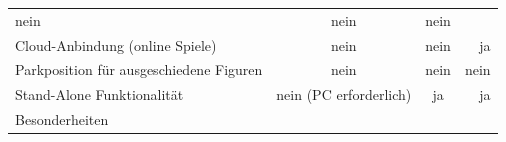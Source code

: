\begin{longtable}[]{@{}lccr@{}}
\begin{minipage}[t]{0.25\columnwidth}
nein\strut
\end{minipage} & \begin{minipage}[t]{0.26\columnwidth}\centering
nein\strut
\end{minipage} & \begin{minipage}[t]{0.19\columnwidth}\raggedleft
nein\strut
\end{minipage}\tabularnewline
\begin{minipage}[t]{0.19\columnwidth}\raggedright
Cloud-Anbindung (online Spiele)\strut
\end{minipage} & \begin{minipage}[t]{0.25\columnwidth}\centering
nein\strut
\end{minipage} & \begin{minipage}[t]{0.26\columnwidth}\centering
nein\strut
\end{minipage} & \begin{minipage}[t]{0.19\columnwidth}\raggedleft
ja\strut
\end{minipage}\tabularnewline
\begin{minipage}[t]{0.19\columnwidth}\raggedright
Parkposition für ausgeschiedene Figuren\strut
\end{minipage} & \begin{minipage}[t]{0.25\columnwidth}\centering
nein\strut
\end{minipage} & \begin{minipage}[t]{0.26\columnwidth}\centering
nein\strut
\end{minipage} & \begin{minipage}[t]{0.19\columnwidth}\raggedleft
nein\strut
\end{minipage}\tabularnewline
\begin{minipage}[t]{0.19\columnwidth}\raggedright
Stand-Alone Funktionalität\strut
\end{minipage} & \begin{minipage}[t]{0.25\columnwidth}\centering
nein (PC erforderlich)\strut
\end{minipage} & \begin{minipage}[t]{0.26\columnwidth}\centering
ja\strut
\end{minipage} & \begin{minipage}[t]{0.19\columnwidth}\raggedleft
ja\strut
\end{minipage}\tabularnewline
\begin{minipage}[t]{0.19\columnwidth}\raggedright
Besonderheiten\strut
\end{minipage} & \begin{minipage}[t]{0.25\columnwidth}\centering

\end{minipage}
\end{longtable}
